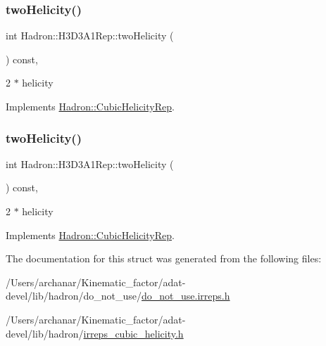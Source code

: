 \subsubsection{\texorpdfstring{twoHelicity()}{twoHelicity()}\hspace{0.1cm}{\footnotesize\ttfamily [2/3]}}
{\footnotesize\ttfamily int Hadron\+::\+H3\+D3\+A1\+Rep\+::two\+Helicity (\begin{DoxyParamCaption}{ }\end{DoxyParamCaption}) const\hspace{0.3cm}{\ttfamily [inline]}, {\ttfamily [virtual]}}

2 $\ast$ helicity 

Implements \mbox{\hyperlink{structHadron_1_1CubicHelicityRep_af507aa56fc2747eacc8cb6c96db31ecc}{Hadron\+::\+Cubic\+Helicity\+Rep}}.

\mbox{\label{structHadron_1_1H3D3A1Rep_a6224faf1aafe58abef4151638b0ccacb}} 
\subsubsection{\texorpdfstring{twoHelicity()}{twoHelicity()}\hspace{0.1cm}{\footnotesize\ttfamily [3/3]}}
{\footnotesize\ttfamily int Hadron\+::\+H3\+D3\+A1\+Rep\+::two\+Helicity (\begin{DoxyParamCaption}{ }\end{DoxyParamCaption}) const\hspace{0.3cm}{\ttfamily [inline]}, {\ttfamily [virtual]}}

2 $\ast$ helicity 

Implements \mbox{\hyperlink{structHadron_1_1CubicHelicityRep_af507aa56fc2747eacc8cb6c96db31ecc}{Hadron\+::\+Cubic\+Helicity\+Rep}}.



The documentation for this struct was generated from the following files\+:\begin{DoxyCompactItemize}
\item 
/\+Users/archanar/\+Kinematic\+\_\+factor/adat-\/devel/lib/hadron/do\+\_\+not\+\_\+use/\mbox{\hyperlink{adat-devel_2lib_2hadron_2do__not__use_2do__not__use_8irreps_8h}{do\+\_\+not\+\_\+use.\+irreps.\+h}}\item 
/\+Users/archanar/\+Kinematic\+\_\+factor/adat-\/devel/lib/hadron/\mbox{\hyperlink{adat-devel_2lib_2hadron_2irreps__cubic__helicity_8h}{irreps\+\_\+cubic\+\_\+helicity.\+h}}\end{DoxyCompactItemize}
